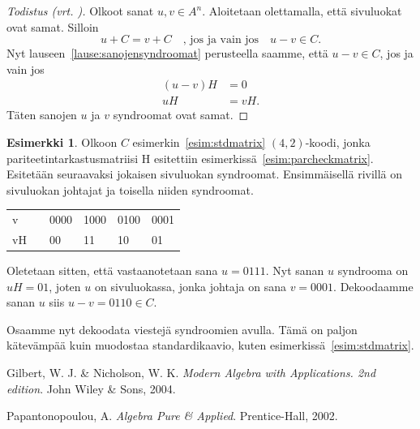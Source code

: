 \documentclass[a4paper,12pt,leqno,oneside]{report} %
\theoremstyle{plain}
\theoremstyle{plain}
\theoremstyle{definition}
\newtheorem{esimerkki}{Esimerkki}[chapter]
\theoremstyle{remark}
\numberwithin{equation}{chapter}
\begin{document}
    \begin{proof}[Todistus \upshape(vrt. {\cite[s.~500]{PA}})]\label{tod:sivuluokkiensyndroomat}
        Olkoot sanat $u, v \in A^n$. Aloitetaan olettamalla, että sivuluokat ovat samat. Silloin
        \[
            u + C = v + C \quad \text{, jos ja vain jos} \quad u - v \in C.
        \]
        Nyt lauseen~\ref{lause:sanojensyndroomat} perusteella saamme, että $u - v \in C$, jos ja vain jos
        \begin{align*}
            (u - v)H &= 0 \\
            uH &= vH.
        \end{align*}
        Täten sanojen $u$ ja $v$ syndroomat ovat samat.
    \end{proof} 

    \begin{esimerkki}
        Olkoon $C$ esimerkin~\ref{esim:stdmatrix} $(4,2)$-koodi, jonka pariteetintarkastusmatriisi H esitettiin esimerkissä~\ref{esim:parcheckmatrix}. Esitetään seuraavaksi jokaisen sivuluokan syndroomat. Ensimmäisellä rivillä on sivuluokan johtajat ja toisella niiden syndroomat.
        \begin{center}
            \begin{tabular}{llllll}
                v && 0000 & 1000 & 0100 & 0001 \\
                vH  &&  00 & 11 & 10 & 01
            \end{tabular}
        \end{center}
        Oletetaan sitten, että vastaanotetaan sana $u = 0111$. Nyt sanan $u$ syndrooma on $uH = 01$, joten $u$ on sivuluokassa, jonka johtaja on sana $v =0001$. Dekoodaamme sanan $u$ siis $u - v = 0110 \in C$.
        
        Osaamme nyt dekoodata viestejä syndroomien avulla. Tämä on paljon kätevämpää kuin muodostaa standardikaavio, kuten esimerkissä~\ref{esim:stdmatrix}.
    \end{esimerkki}

    \begin{thebibliography}{9}

        Gilbert, W. J. \& Nicholson, W. K.
        \emph{Modern Algebra with Applications. 2nd edition}.
        John Wiley \& Sons, 2004.

        Papantonopoulou, A.
        \emph{Algebra Pure \& Applied}.
        Prentice-Hall, 2002.


\end{thebibliography}
\end{document}
